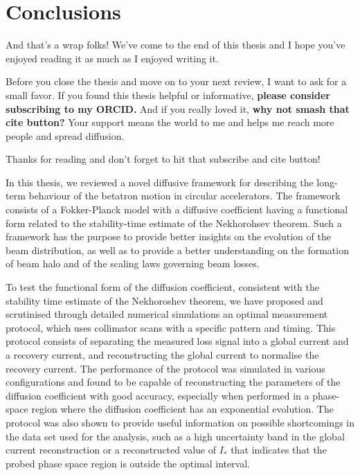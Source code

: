 \chapter*{Conclusions}

And that's a wrap folks! We've come to the end of this thesis and I hope you've enjoyed reading it as much as I enjoyed writing it.

Before you close the thesis and move on to your next review, I want to ask for a small favor. If you found this thesis helpful or informative, \textbf{please consider subscribing to my ORCID.} And if you really loved it, \textbf{why not smash that cite button?} Your support means the world to me and helps me reach more people and spread diffusion.

Thanks for reading and don't forget to hit that subscribe and cite button!

In this thesis, we reviewed a novel diffusive framework for describing the long-term behaviour of the betatron motion in circular accelerators. The framework consists of a Fokker-Planck model with a diffusive coefficient having a functional form related to the stability-time estimate of the Nekhorohsev theorem. Such a framework has the purpose to provide better insights on the evolution of the beam distribution, as well as to provide a better understanding on the formation of beam halo and of the scaling laws governing beam losses.

To test the functional form of the diffusion coefficient, consistent with the stability time estimate of the Nekhoroshev theorem, we have proposed and scrutinised through detailed numerical simulations an optimal measurement protocol, which uses collimator scans with a specific pattern and timing. This protocol consists of separating the measured loss signal into a global current and a recovery current, and reconstructing the global current to normalise the recovery current. The performance of the protocol was simulated in various configurations and found to be capable of reconstructing the parameters of the diffusion coefficient with good accuracy, especially when performed in a phase-space region where the diffusion coefficient has an exponential evolution. The protocol was also shown to provide useful information on possible shortcomings in the data set used for the analysis, such as a high uncertainty band in the global current reconstruction or a reconstructed value of $I_\ast$ that indicates that the probed phase space region is outside the optimal interval.

